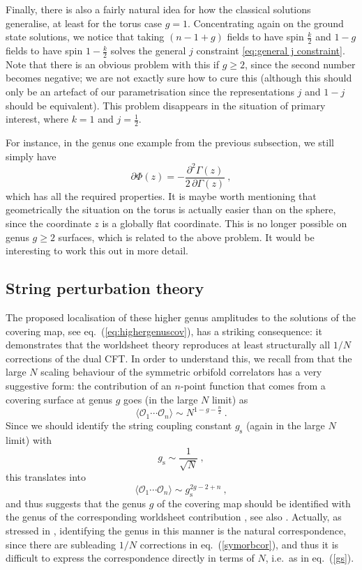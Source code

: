 \documentclass[12pt,a4paper]{article}
\newcommand{\be}{\begin{equation}}
\newcommand{\ee}{\end{equation}}
\begin{document}
Finally, there is also a fairly natural idea for how the classical solutions generalise, at least for the torus case $g=1$. Concentrating again on the ground state solutions, we notice that taking $(n-1+g)$ fields to have spin $\tfrac{k}{2}$ and $1-g$ fields to have spin $1-\tfrac{k}{2}$ solves the general $j$ constraint \eqref{eq:general j constraint}. Note that there is an obvious problem with this if $g\ge 2$, since the second number becomes negative; we are not exactly sure how to cure this (although this should only be an artefact of our parametrisation since the representations $j$ and $1-j$ should be equivalent). This problem disappears in the situation of primary interest, where $k=1$ and $j=\tfrac{1}{2}$.

For instance, in the genus one example from the previous subsection, we still simply have
\be 
\partial \Phi(z)=- \frac{\partial^2 \Gamma(z)}{2\,\partial \Gamma(z)}\ ,
\ee
which has all the required properties. It is maybe worth mentioning that geometrically the situation on the torus is actually easier than on the sphere, since the coordinate $z$ is a globally flat coordinate. This is no longer possible on genus $g \ge 2$ surfaces, which is related to the above problem. It would be interesting to work this out in more detail.

\subsection{String perturbation theory}

The proposed localisation of these higher genus amplitudes to the solutions of the covering map, see eq.~(\ref{eq:highergenuscov}), has a striking consequence: it demonstrates that the worldsheet theory reproduces at least structurally all $1/N$ corrections of the dual CFT. In order to understand this, we recall from \cite{Pakman:2009zz} that the large $N$ scaling behaviour of the symmetric orbifold correlators has a very suggestive form: the contribution of an $n$-point function that comes from a covering surface at genus $g$ goes (in the large $N$ limit) as 
\be\label{symorbcor}
\langle \mathcal{O}_1 \cdots \mathcal{O}_n \rangle \sim N^{1-g-\frac{n}{2}}  \ . 
\ee
Since we should identify the string coupling constant $g_\text{s}$ (again in the large $N$ limit) with 
\be\label{gs}
g_\text{s} \sim \frac{1}{\sqrt{N}} \ ,
\ee
this translates into 
\be
\langle \mathcal{O}_1 \cdots \mathcal{O}_n \rangle \sim g_\text{s}^{2g-2 + n }  \ ,
\ee
and thus suggests that the genus $g$ of the covering map should be identified with the genus of the corresponding worldsheet contribution \cite{Pakman:2009zz}, see also \cite{Lunin:2000yv}. Actually, as stressed in \cite{Pakman:2009zz}, identifying the genus in this manner is the natural correspondence, since there are subleading $1/N$ corrections in eq.~(\ref{symorbcor}), and thus it is difficult to express the correspondence directly in terms of $N$, i.e.\ as in eq.~(\ref{gs}).
\end{document}
